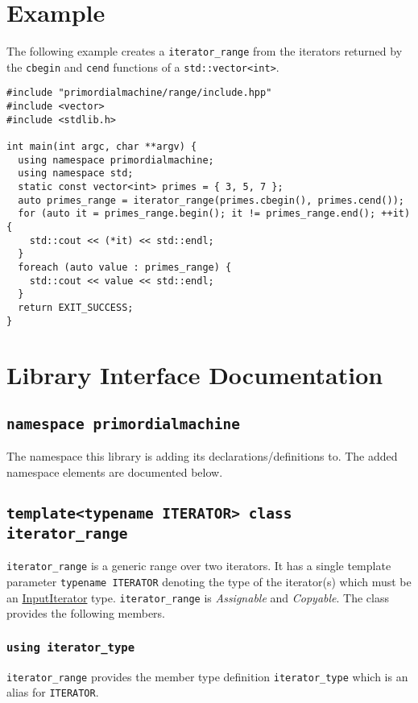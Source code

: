 \documentclass[oneside]{article}
\begin{document}
\section{Example}
The following example creates a \verb+iterator_range+ from the iterators returned by the
\verb+cbegin+ and \verb+cend+ functions of a \verb+std::vector<int>+.
\begin{verbatim}
#include "primordialmachine/range/include.hpp"
#include <vector>
#include <stdlib.h>

int main(int argc, char **argv) {
  using namespace primordialmachine;
  using namespace std;
  static const vector<int> primes = { 3, 5, 7 };
  auto primes_range = iterator_range(primes.cbegin(), primes.cend());
  for (auto it = primes_range.begin(); it != primes_range.end(); ++it) {
	std::cout << (*it) << std::endl;
  }
  foreach (auto value : primes_range) {
    std::cout << value << std::endl;
  }
  return EXIT_SUCCESS;
}
\end{verbatim}


\section{Library Interface Documentation}

\subsection{\texttt{namespace primordialmachine}}
The namespace this library is adding its declarations/definitions to.
The added namespace elements are documented below.

\subsection{\texttt{template<typename ITERATOR> class iterator\_range}}
\texttt{iterator\_range} is a generic range over two iterators.
It has a single template parameter \texttt{typename ITERATOR} denoting the type of the     iterator(s)
which must be an \href{https://en.cppreference.com/w/cpp/named_req/InputIterator}{InputIterator} type.
\texttt{iterator\_range} is \textit{Assignable} and \textit{Copyable}. The class provides         the
following members.

\subsubsection{\texttt{using iterator\_type}}
\texttt{iterator\_range} provides the member type definition \texttt{iterator\_type} which is an alias
for \texttt{ITERATOR}.
\end{document}
